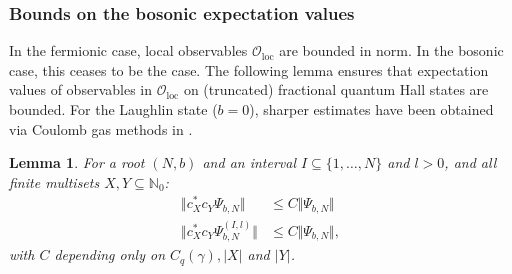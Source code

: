 \documentclass[letterpaper, DIV=17]{scrartcl}
\newtheorem{lemma}[theorem]{Lemma}
\numberwithin{equation}{section}
\theoremstyle{definition}
\newcommand{\loc}{\mathrm{loc}}
\begin{document}
\subsubsection{Bounds on the bosonic expectation values}
In the fermionic case, local observables $ \mathcal{O}_\loc  $ are bounded in norm. In the bosonic case, this ceases to be the case. The following lemma ensures that expectation values of observables in $\mathcal{O}_\mathrm{loc}$ on (truncated) fractional quantum Hall states are bounded. For the Laughlin state ($b=0$), sharper estimates have been obtained via Coulomb gas methods in \cite[Prop.~5.5]{jansen2012fermionic}.
%
%
\begin{lemma} \label{lm:norms observables}
	For a root $ (N,b) $ and an interval  $I\subseteq \{1, \dots, N\}$ and $l>0$, 
	and all finite multisets $X,Y\subseteq \mathbb{N}_0$:
	\begin{equation} \label{norms local observables}
		\begin{split}
			\Vert c_X^* c_Y \Psi_{b,N} \Vert &\leq C \Vert \Psi_{b,N}\Vert \\
			\Vert c_X^* c_Y \Psi_{b,N}^{(I,l)} \Vert &\leq C \Vert \Psi_{b,N}\Vert,
		\end{split}
	\end{equation}
	with $C$ depending only on $C_q(\gamma), \vert X\vert$ and $\vert Y\vert$.
\end{lemma}
\end{document}
